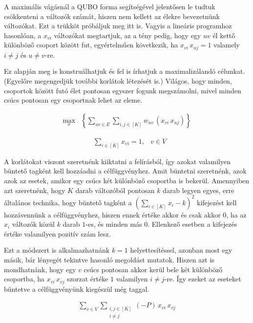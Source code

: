 A maximális vágásnál a QUBO forma segítségével jelentősen le tudtuk csökkenteni a változók számát, hiszen nem kellett az élekre bevezetnünk változókat. Ezt a trükköt próbáljuk meg itt is.
Vagyis a lineáris programhoz hasonlóan, a $x_{vi}$ változókat megtartjuk, az a tény pedig, hogy egy $uv$ él kettő különböző csoport között fut, egyértelműen következik, ha $x_{vi} \, x_{uj}=1$ valamely $i \neq j$ és $u \neq v$-re.

Ez alapján meg is konstruálhatjuk és fel is írhatjuk a maximalizálandó célunkat. (Egyelőre megengedjük további korlátok létezését is.) Világos, hogy minden, csoportok között futó élet pontosan egyszer fogunk megszámolni, mivel minden csúcs pontosan egy csoportnak lehet az eleme.

\begin{align}
	 \max_{x} & \left\{ \sum _{uv \in E}  \sum _{ {i,j} \in [K]} w_{uv}\,(x_{vi} \, x_{uj}) \right\}
\end{align}

\begin{align}
	&\sum _{i \in [K]} x_{vi} = 1, &v \in V
\end {align}

A korlátokat viszont szeretnénk kiiktatni a felírásból, így azokat valamilyen büntető tagként kell hozzáadni a célfüggvényhez. Amit büntetni szeretnénk, azok azok az esetek, amikor egy csúcs két különböző csoportba is bekerül. Amennyiben azt szeretnénk, hogy $K$ darab változóból pontosan $k$ darab legyen egyes, erre általános technika, hogy büntető tagként a $(\sum _{i \in [K]} x_i - k)^2 $ kifejezést kell hozzávennünk a célfüggvényhez, hiszen ennek értéke akkor és csak akkor $0$, ha az $x_i$ változók közül $k$ darab $1$-es, és minden más $0$. Ellenkező esetben a kifejezés értéke valamilyen pozitív szám lesz.

Ezt a módszert is alkalmazhatnánk $k=1$ helyettesítéssel, azonban most egy másik, bár lényegét tekintve hasonló megoldást mutatok. Hiszen azt is mondhatnánk, hogy egy $v$ csúcs pontosan akkor kerül bele két különböző csoportba, ha $x_{vi} \, x_{vj}$ szorzat értéke $1$ valamilyen $i \neq j$-re. Így ezeket az eseteket büntetve a célfüggvényünk kiegészül még  taggal. 

\begin{align}
	\sum _{v \in V } \sum _{\substack{ i,j \in [K] \\  i \neq j}} (-P) \, x_{vi} \, x_{vj} \label{QUBOOnehotonlyone}
\end{align}

